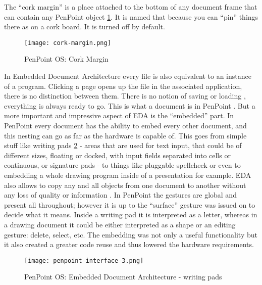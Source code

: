 The ``cork margin'' is a place attached to the bottom of any document frame that
can contain any PenPoint object \ref{fig:cork-margin}. It is named that because
you can ``pin'' things there as on a cork board. It is turned off by default.

\begin{figure}[!h]
    \centering \texttt{[image: cork-margin.png]}
    \caption{PenPoint OS: Cork Margin}
    \label{fig:cork-margin}
\end{figure}

In Embedded Document Architecture every file is also equivalent to an instance
of a program. Clicking a page opens up the file in the associated application,
there is no distinction between them. There is no notion of saving or loading
\cite{startupadv}, everything is always ready to go. This is what a document is
in PenPoint \cite{carr1991} \cite{brown1992}. But a more important and
impressive aspect of EDA is the ``embedded'' part. In PenPoint every document
has the ability to embed every other document, and this nesting can go as far
as the hardware is capable of. This goes from simple stuff like writing pads
\ref{fig:embedded-document-architecture} - areas that are used for text input,
that could be of different sizes, floating or docked, with input fields
separated into cells or continuous, or signature pads - to things like
pluggable spellcheck or even to embedding a whole drawing program inside of
a presentation for example.  EDA also allows to copy any and all objects from
one document to another without any loss of quality or information
\cite{carr1991} \cite{brown1993}. In PenPoint the gestures are global and
present all throughout; however it is up to the ``surface'' gesture was issued
on to decide what it means. Inside a writing pad it is interpreted as a letter,
whereas in a drawing document it could be either interpreted as a shape or an
editing gesture: delete, select, etc. The embedding was not only a useful
functionality but it also created a greater code reuse and thus lowered the
hardware requirements.

\begin{figure}[!h]
    \centering \texttt{[image: penpoint-interface-3.png]}
    \caption{PenPoint OS: Embedded Document Architecture - writing pads}
    \label{fig:embedded-document-architecture}
\end{figure}

